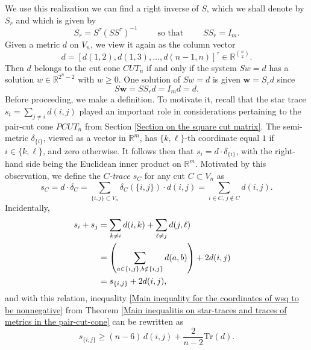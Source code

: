 \documentclass[12pt]{amsart}
\numberwithin{theorem}{section}
\theoremstyle{remark}
\begin{document}
We use this realization we can find a right inverse of $S$, which we shall denote by $S_r$ and which is given by 
$$S_r = S^\tau (SS^\tau)^{-1}\qquad \text{ so that } \qquad SS_r = I_m.$$
Given a metric $d$ on $V_n$, we view it again as the column vector 
$$d = [d(1,2), d(1,3), \dots, d(n-1,n)]^\tau \in \mathbb R^{n\choose 2}.$$ 
Then $d$ belongs to the cut cone $CUT_n$ if and only if the system $Sw=d$ has a solution $w\in \mathbb R^{2^n-2}$ with $w\ge 0$. One solution of $Sw=d$ is given $\mathbf{w} = S_rd$ since 
$$S\mathbf w = SS_r d = I_md = d.$$ 
Before proceeding, we make a definition. To  motivate it, recall that the star trace $s_i = \sum_{j\ne i} d(i,j)$ played an important role in considerations pertaining to the pair-cut cone $PCUT_n$ from Section \ref{Section on the square cut matrix}. The semi-metric $\delta_{\{i\}}$, viewed as a vector in $\mathbb R^m$, has $\{k,\ell\}$-th coordinate equal $1$ if $i\in \{k,\ell\}$, and zero otherwise. It follows then that $s_i = d\cdot \delta_{\{i\}}$, with the right-hand side being the Euclidean inner product on $\mathbb R^m$. Motivated by this observation, we define the {\em $C$-trace $s_C$} for any cut $C\subset V_n$ as 
$$s_C = d\cdot \delta_C   = \sum_{\{i,j\}\subset V_n} \delta_C(\{i,j\})\cdot d(i,j) = \sum_{i\in C,\, j\notin C}d(i,j). $$
Incidentally, 
\begin{align*}
s_i+s_j & = \sum _{k\ne i}d(i,k) + \sum_{\ell\ne j} d(j,\ell) \cr
& = \left(\sum _{a\in\{i,j\}, b\notin\{i,j\}} d(a,b)\right) + 2d(i,j)  \cr 
& =  s_{\{i,j\}} + 2d(i,j), 
\end{align*}
and with this relation, inequality \eqref{Main inequality for the coordinates of wsq to be nonnegative} from Theorem \ref{Main inequalitis on star-traces and traces of metrics in the pair-cut-cone} can be rewritten as 
$$s_{\{i,j\}} \ge (n-6)\, d(i,j) + \frac{2}{n-2}\text{Tr}(d).$$
\end{document}

